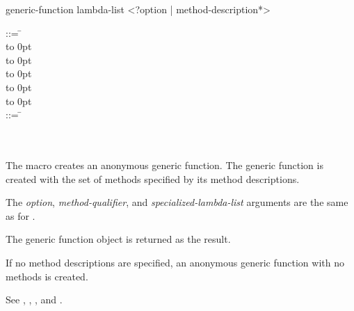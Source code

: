 \begin{defmac}
generic-function lambda-list <?option | {method-description}*>

\begin{tabbing}
 ::= \= \\
\>\hbox to 0pt{\hss\Mor~} \\
\>\hbox to 0pt{\hss\Mor~} \\
\>\hbox to 0pt{\hss\Mor~} \\
\>\hbox to 0pt{\hss\Mor~} \\
\>\hbox to 0pt{\hss\Mor~} \poptabs \\
 ::= \= \\
 \\
\> \\
\>\cd{)} \poptabs
\end{tabbing}
The  macro creates an anonymous generic
function. The generic function is created with the set of methods
specified by its method descriptions.




The {\it option}, {\it method-qualifier}, and {\it
specialized-lambda-list\/} arguments are the same as for 
.


The generic function object is returned as the result.


If no method descriptions are specified, an anonymous generic function with no
methods is created.

See , , , and .
\end{defmac}


